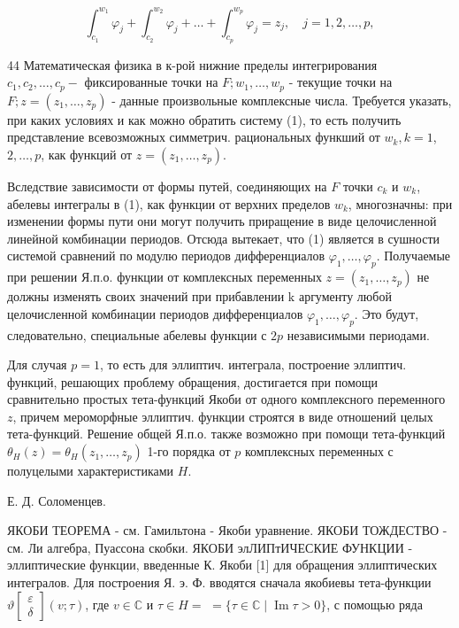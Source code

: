 \documentclass[10pt]{article}
\begin{document}
\[

\int_{c_{1}}^{w_{1}} \varphi_{j}+\int_{c_{2}}^{w_{2}} \varphi_{j}+\ldots+\int_{c_{p}}^{w_{p}} \varphi_{j}=z_{j}, \quad j=1,2, \ldots, p,

\]



44 Математическая физика в к-рой нижние пределы интегрирования $c_{1}, c_{2}, \ldots, c_{p}-$ фиксированные точки на $F ; w_{1}, \ldots, w_{p}$ - текущие точки на $F ; z=\left(z_{1}, \ldots, z_{p}\right)$ - данные произвольные комплексные числа. Требуется указать, при каких условиях и как можно обратить систему (1), то есть получить представление всевозможных симметрич. рациональных функший от $w_{k}, k=1$, $2, \ldots, p$, как функций от $z=\left(z_{1}, \ldots, z_{p}\right)$.



Вследствие зависимости от формы путей, соединяющих на $F$ точки $c_{k}$ и $w_{k}$, абелевы интегралы в (1), как функции от верхних пределов $w_{k}$, многозначны: при изменении формы пути они могут получить приращение в виде целочисленной линейной комбинации периодов. Отсюда вытекает, что (1) является в сушности системой сравнений по модулю периодов дифференциалов $\varphi_{1}, \ldots, \varphi_{p}$. Получаемые при решении Я.п.о. функции от комплексных переменных $z=\left(z_{1}, \ldots, z_{p}\right)$ не должны изменять своих значений при прибавлении $\mathrm{k}$ аргументу любой целочисленной комбинации периодов дифференциалов $\varphi_{1}, \ldots, \varphi_{p}$. Это будут, следовательно, специальные абелевы функции с $2 p$ независимыми периодами.



Для случая $p=1$, то есть для эллиптич. интеграла, построение эллиптич. функций, решающих проблему обращения, достигается при помощи сравнительно простых тета-функций Якоби от одного комплексного переменного $z$, причем мероморфные эллиптич. функции строятся в виде отношений целых тета-функций. Решение общей Я.п.о. также возможно при помощи тета-функций $\theta_{H}(z)=\theta_{H}\left(z_{1}, \ldots, z_{p}\right)$ 1-го порядка от $p$ комплексных переменных с полуцелыми характеристиками $H$.



Е. Д. Соломенцев.



ЯКОБИ ТЕОРЕМА - см. Гамильтона - Якоби уравнение. ЯКОБИ ТОЖДЕСТВО - см. Ли алгебра, Пуассона скобки. ЯКОБИ элЛИПтИЧЕСКИЕ ФУНКЦИИ - эллиптические функции, введенные К. Якоби [1] для обращения эллиптических интегралов. Для построения Я. э. Ф. вводятся сначала якобиевы тета-функции $\vartheta\left[\begin{array}{l}\varepsilon \\ \delta\end{array}\right](v ; \tau)$, где $v \in \mathbb{C}$ и $\tau \in H=$ $=\{\tau \in \mathbb{C} \mid \operatorname{Im} \tau>0\}$, с помощью ряда
\end{document}
